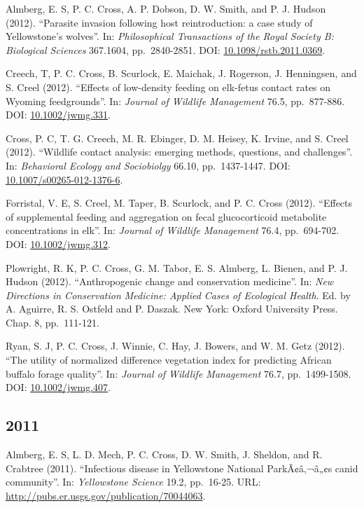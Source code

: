 \documentclass[12pt,]{article}
\begin{document}
Almberg, E. S, P. C. Cross, A. P. Dobson, D. W. Smith, and P. J. Hudson
(2012). ``Parasite invasion following host reintroduction: a case study
of Yellowstone's wolves''. In: \emph{Philosophical Transactions of the
Royal Society B: Biological Sciences} 367.1604, pp.~2840-2851. DOI:
\href{https://doi.org/10.1098\%2Frstb.2011.0369}{10.1098/rstb.2011.0369}.

Creech, T, P. C. Cross, B. Scurlock, E. Maichak, J. Rogerson, J.
Henningsen, and S. Creel (2012). ``Effects of low-density feeding on
elk-fetus contact rates on Wyoming feedgrounds''. In: \emph{Journal of
Wildlife Management} 76.5, pp.~877-886. DOI:
\href{https://doi.org/10.1002\%2Fjwmg.331}{10.1002/jwmg.331}.

Cross, P. C, T. G. Creech, M. R. Ebinger, D. M. Heisey, K. Irvine, and
S. Creel (2012). ``Wildlife contact analysis: emerging methods,
questions, and challenges''. In: \emph{Behavioral Ecology and
Sociobiolgy} 66.10, pp.~1437-1447. DOI:
\href{https://doi.org/10.1007\%2Fs00265-012-1376-6}{10.1007/s00265-012-1376-6}.

Forristal, V. E, S. Creel, M. Taper, B. Scurlock, and P. C. Cross
(2012). ``Effects of supplemental feeding and aggregation on fecal
glucocorticoid metabolite concentrations in elk''. In: \emph{Journal of
Wildlife Management} 76.4, pp.~694-702. DOI:
\href{https://doi.org/10.1002\%2Fjwmg.312}{10.1002/jwmg.312}.

Plowright, R. K, P. C. Cross, G. M. Tabor, E. S. Almberg, L. Bienen, and
P. J. Hudson (2012). ``Anthropogenic change and conservation medicine''.
In: \emph{New Directions in Conservation Medicine: Applied Cases of
Ecological Health}. Ed. by A. Aguirre, R. S. Ostfeld and P. Daszak. New
York: Oxford University Press. Chap. 8, pp.~111-121.

Ryan, S. J, P. C. Cross, J. Winnie, C. Hay, J. Bowers, and W. M. Getz
(2012). ``The utility of normalized difference vegetation index for
predicting African buffalo forage quality''. In: \emph{Journal of
Wildlife Management} 76.7, pp.~1499-1508. DOI:
\href{https://doi.org/10.1002\%2Fjwmg.407}{10.1002/jwmg.407}.

\hypertarget{section-8}{%
\subsection{2011}\label{section-8}}

Almberg, E. S, L. D. Mech, P. C. Cross, D. W. Smith, J. Sheldon, and R.
Crabtree (2011). ``Infectious disease in Yellowstone National
ParkÃ¢â‚¬â„¢s canid community''. In: \emph{Yellowstone Science} 19.2,
pp.~16-25. URL: \url{http://pubs.er.usgs.gov/publication/70044063}.
\end{document}
